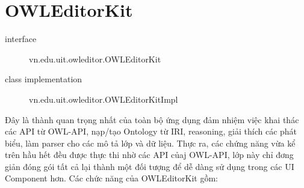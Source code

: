 
\section{OWLEditorKit}
\begin{description}
\item[interface] vn.edu.uit.owleditor.OWLEditorKit
\item[class implementation] vn.edu.uit.owleditor.OWLEditorKitImpl
\end{description}
Đây là thành quan trọng nhất của toàn bộ ứng dụng đảm nhiệm việc khai thác các API từ OWL-API, nạp/tạo Ontology từ IRI, reasoning, giải thích các phát biểu, làm parser cho các mô tả lớp và dữ liệu. Thực ra, các chứng năng vừa kể trên hầu hết đều được thực thi nhờ các API củaj OWL-API, lớp này chỉ đơng giản đóng gói tất cả lại thành một đối tượng để dễ dàng sử dụng trong các UI Component hơn. Các chức năng của OWLEditorKit gồm:

